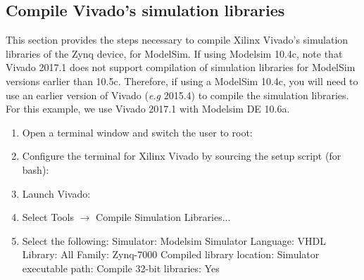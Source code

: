 \subsection{Compile Vivado's simulation libraries}
	This section provides the steps necessary to compile Xilinx Vivado's simulation libraries of the Zynq device, for ModelSim. If using Modelsim 10.4c, note that Vivado 2017.1 does not support compilation of simulation libraries for ModelSim versions earlier than 10.5c. Therefore, if using a ModelSim 10.4c, you will need to use an earlier version of Vivado (\textit{e.g} 2015.4) to compile the simulation libraries. For this example, we use Vivado 2017.1 with Modelsim DE 10.6a.

\begin{flushleft}
	\begin{enumerate}
		\item Open a terminal window and switch the user to root:
			\subitem {}
		\item Configure the terminal for Xilinx Vivado by sourcing the setup script (for bash):
			\subitem {}
		\item Launch Vivado:
			\subitem {}
		\item Select Tools $\rightarrow$ Compile Simulation Libraries...
		\item Select the following:
			\subitem Simulator: Modelsim Simulator
			\subitem Language: VHDL
			\subitem Library: All
			\subitem Family: Zynq-7000
			\subitem Compiled library location: 
			\subitem Simulator executable path: 
			\subitem Compile 32-bit libraries: Yes


\end{enumerate}
\end{flushleft}
